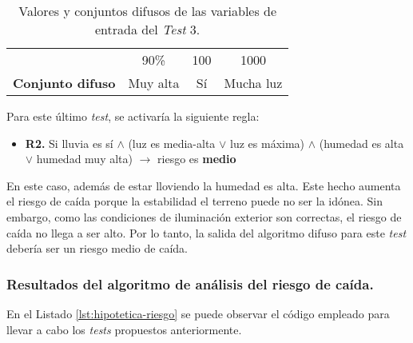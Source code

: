 \begin{table}[!h]
\centering
\begin{tabular}{l|c|c|c|}
\cline{2-4}
                                                                                    & \cellcolor[HTML]{656565}{\color[HTML]{FFFFFF} \textbf{Humedad}} & \cellcolor[HTML]{656565}{\color[HTML]{FFFFFF} \textbf{Lluvia}} & \cellcolor[HTML]{656565}{\color[HTML]{FFFFFF} \textbf{Luz}} \\ \hline
\rowcolor[HTML]{EFEFEF} 
\multicolumn{1}{|l|}{\cellcolor[HTML]{EFEFEF}{\color[HTML]{000000} \textbf{Valor}}} & {\color[HTML]{000000} 90\%}                                     & {\color[HTML]{000000} 100}                                     & {\color[HTML]{000000} 1000}                                 \\ \hline
\multicolumn{1}{|l|}{{\color[HTML]{000000} \textbf{Conjunto difuso}}}               & {\color[HTML]{000000} Muy alta}                                 & {\color[HTML]{000000} Sí}                                      & {\color[HTML]{000000} Mucha luz}                            \\ \hline
\end{tabular}
\caption{Valores y conjuntos difusos de las variables de entrada del \textit{Test} 3.}
\label{table:test3}
\end{table}

Para este último \textit{test}, se activaría la siguiente regla:

\begin{itemize}
\item \textbf{R2.} Si lluvia es sí $\wedge$ (luz es media-alta $\vee$ luz es máxima) $\wedge$ (humedad es alta $\vee$ humedad muy alta) $\rightarrow$ riesgo es \textbf{medio}
\end{itemize}

En este caso, además de estar lloviendo la humedad es alta. Este hecho aumenta el riesgo de caída porque la estabilidad el terreno puede no ser la idónea. Sin embargo, como las condiciones de iluminación exterior son correctas, el riesgo de caída no llega a ser alto. Por lo tanto, la salida del algoritmo difuso para este \textit{test} debería ser un riesgo medio de caída.

\subsubsection{Resultados del algoritmo de análisis del riesgo de caída.}

En el Listado \ref{lst:hipotetica-riesgo} se puede observar el código empleado para llevar a cabo los \textit{tests} propuestos anteriormente.

